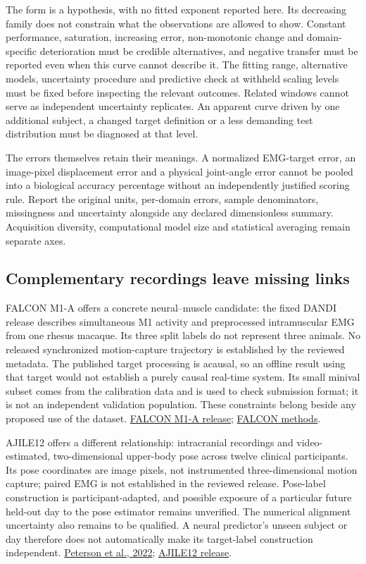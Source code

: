 The form is a hypothesis, with no fitted exponent reported here. Its decreasing family does not constrain what the observations are allowed to show. Constant performance, saturation, increasing error, non-monotonic change and domain-specific deterioration must be credible alternatives, and negative transfer must be reported even when this curve cannot describe it. The fitting range, alternative models, uncertainty procedure and predictive check at withheld scaling levels must be fixed before inspecting the relevant outcomes. Related windows cannot serve as independent uncertainty replicates. An apparent curve driven by one additional subject, a changed target definition or a less demanding test distribution must be diagnosed at that level.

The errors themselves retain their meanings. A normalized EMG-target error, an image-pixel displacement error and a physical joint-angle error cannot be pooled into a biological accuracy percentage without an independently justified scoring rule. Report the original units, per-domain errors, sample denominators, missingness and uncertainty alongside any declared dimensionless summary. Acquisition diversity, computational model size and statistical averaging remain separate axes.

\subsection{Complementary recordings leave missing links}

FALCON M1-A offers a concrete neural--muscle candidate: the fixed DANDI release describes simultaneous M1 activity and preprocessed intramuscular EMG from one rhesus macaque. Its three split labels do not represent three animals. No released synchronized motion-capture trajectory is established by the reviewed metadata. The published target processing is acausal, so an offline result using that target would not establish a purely causal real-time system. Its small minival subset comes from the calibration data and is used to check submission format; it is not an independent validation population. These constraints belong beside any proposed use of the dataset. \href{https://doi.org/10.48324/dandi.000941/0.241029.1405}{FALCON M1-A release}; \href{https://papers.nips.cc/paper_files/paper/2024/file/8c2e6bb15be1894b8fb4e0f9bcad1739-Paper-Datasets_and_Benchmarks_Track.pdf}{FALCON methods}.

AJILE12 offers a different relationship: intracranial recordings and video-estimated, two-dimensional upper-body pose across twelve clinical participants. Its pose coordinates are image pixels, not instrumented three-dimensional motion capture; paired EMG is not established in the reviewed release. Pose-label construction is participant-adapted, and possible exposure of a particular future held-out day to the pose estimator remains unverified. The numerical alignment uncertainty also remains to be qualified. A neural predictor's unseen subject or day therefore does not automatically make its target-label construction independent. \href{https://doi.org/10.1038/s41597-022-01280-y}{Peterson et al., 2022}; \href{https://doi.org/10.48324/dandi.000055/0.220127.0436}{AJILE12 release}.

